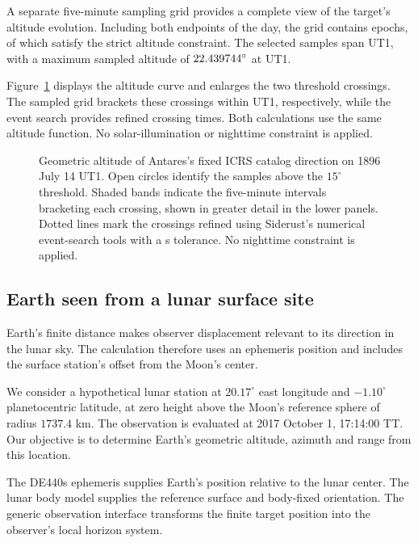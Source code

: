 A separate five-minute sampling grid provides a complete view of the target's altitude evolution.
Including both endpoints of the day, the grid contains \ViewingSampleCount{} epochs, of which
\ViewingSelectedCount{} satisfy the strict altitude constraint. The selected samples span
\ViewingSpans{} UT1, with a maximum sampled altitude of $22.439744^\circ$ at
\ViewingMaximumTime{} UT1.

Figure~\ref{fig:viewing-window} displays the altitude curve and enlarges the two threshold
crossings. The sampled grid brackets these crossings within \ViewingBrackets{} UT1, respectively,
while the event search provides refined crossing times. Both calculations use the same altitude
function. No solar-illumination or nighttime constraint is applied.

\begin{figure}[!tbp]
    \centering
    
    \caption{Geometric altitude of Antares's fixed ICRS
        catalog direction on 1896 July 14 UT1.
        Open circles identify the \ViewingSelectedCount{}
        samples above the $15^\circ$ threshold.
        Shaded bands indicate the five-minute intervals
        bracketing each crossing, shown in greater detail
        in the lower panels. Dotted lines mark the
        crossings refined using Siderust's numerical
        event-search tools with a
        \ViewingEventTolerance{} s tolerance.
        No nighttime constraint is applied.}
    \label{fig:viewing-window}
\end{figure}

\subsection{Earth seen from a lunar surface site}
\label{sec:lunar-example}

Earth's finite distance makes observer displacement relevant to its direction in the lunar sky. The
calculation therefore uses an ephemeris position and includes the surface station's offset from the
Moon's center.

We consider a hypothetical lunar station at $20.17^\circ$ east longitude and $-1.10^\circ$
planetocentric latitude, at zero height above the Moon's reference sphere of radius $1737.4$ km.
The observation is evaluated at 2017 October 1, 17:14:00 TT. Our objective is to determine Earth's
geometric altitude, azimuth and range from this location.

The DE440s ephemeris supplies Earth's position relative to the lunar center. The lunar body model
supplies the reference surface and body-fixed orientation. The generic observation interface
transforms the finite target position into the observer's local horizon system.

